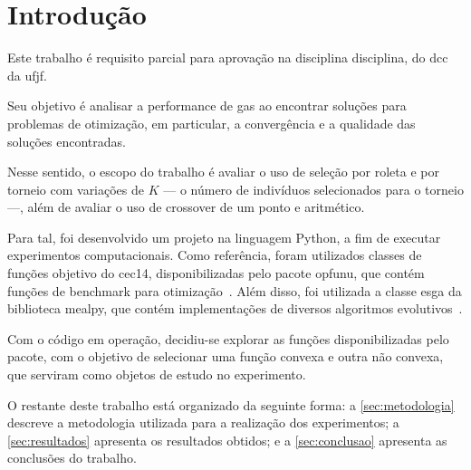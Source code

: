 \section{Introdução}%
\label{sec:introducao}

Este trabalho é requisito parcial para aprovação na disciplina \gls{disciplina}, do \gls{dcc} da \gls{ufjf}.

Seu objetivo é analisar a performance de \glspl{ga} ao encontrar soluções para problemas de otimização, em particular, a convergência e a qualidade das soluções encontradas.

Nesse sentido, o escopo do trabalho é avaliar
o uso de seleção por roleta e por torneio com variações de \(K\) --- o número de indivíduos selecionados para o torneio ---, além de avaliar o uso de \gls{crossover} de um ponto e aritmético.

Para tal, foi desenvolvido um projeto na linguagem Python, a fim de executar experimentos computacionais.
Como referência, foram utilizados classes de funções objetivo do \gls{cec14}, disponibilizadas pelo pacote \gls{opfunu}, que contém funções de benchmark para otimização~\cite{opfunu_paper}.
Além disso, foi utilizada a classe \gls{esga} da biblioteca \gls{mealpy}, que contém implementações de diversos algoritmos evolutivos~\cite{mealpy_paper}.

Com o código em operação, decidiu-se explorar as funções disponibilizadas pelo pacote, com o objetivo de selecionar uma função convexa e outra não convexa, que serviram como objetos de estudo no experimento.

O restante deste trabalho está organizado da seguinte forma: a \autoref{sec:metodologia} descreve a metodologia utilizada para a realização dos experimentos; a \autoref{sec:resultados} apresenta os resultados obtidos; e a \autoref{sec:conclusao} apresenta as conclusões do trabalho.
